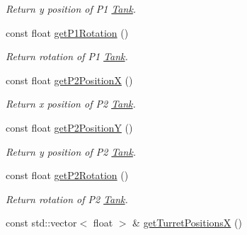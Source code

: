 \begin{DoxyCompactItemize}
\begin{DoxyCompactList}\small\item\em Return y position of P1 \hyperlink{class_tank}{Tank}. \end{DoxyCompactList}\item 
\hypertarget{class_tracking_manager_aad99796d4377109c93177204db15d1a8}{const float \hyperlink{class_tracking_manager_aad99796d4377109c93177204db15d1a8}{get\+P1\+Rotation} ()}\label{class_tracking_manager_aad99796d4377109c93177204db15d1a8}

\begin{DoxyCompactList}\small\item\em Return rotation of P1 \hyperlink{class_tank}{Tank}. \end{DoxyCompactList}\item 
\hypertarget{class_tracking_manager_acb6e621ee44b3d4589fd9e5941eb210f}{const float \hyperlink{class_tracking_manager_acb6e621ee44b3d4589fd9e5941eb210f}{get\+P2\+Position\+X} ()}\label{class_tracking_manager_acb6e621ee44b3d4589fd9e5941eb210f}

\begin{DoxyCompactList}\small\item\em Return x position of P2 \hyperlink{class_tank}{Tank}. \end{DoxyCompactList}\item 
\hypertarget{class_tracking_manager_af4f90d28fce0d8930ae555a3c1fa4bb8}{const float \hyperlink{class_tracking_manager_af4f90d28fce0d8930ae555a3c1fa4bb8}{get\+P2\+Position\+Y} ()}\label{class_tracking_manager_af4f90d28fce0d8930ae555a3c1fa4bb8}

\begin{DoxyCompactList}\small\item\em Return y position of P2 \hyperlink{class_tank}{Tank}. \end{DoxyCompactList}\item 
\hypertarget{class_tracking_manager_a61bc8a3a82f0cd4064d5e2aa53677ebb}{const float \hyperlink{class_tracking_manager_a61bc8a3a82f0cd4064d5e2aa53677ebb}{get\+P2\+Rotation} ()}\label{class_tracking_manager_a61bc8a3a82f0cd4064d5e2aa53677ebb}

\begin{DoxyCompactList}\small\item\em Return rotation of P2 \hyperlink{class_tank}{Tank}. \end{DoxyCompactList}\item 
\hypertarget{class_tracking_manager_ab74d90eb6562d1c25a8a3abefa36d588}{const std\+::vector$<$ float $>$ \& \hyperlink{class_tracking_manager_ab74d90eb6562d1c25a8a3abefa36d588}{get\+Turret\+Positions\+X} ()}\label{class_tracking_manager_ab74d90eb6562d1c25a8a3abefa36d588}


\end{DoxyCompactItemize}

